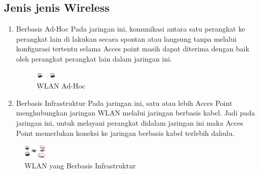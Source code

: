 \subsection{Jenis jenis Wireless}
\begin{enumerate}
\item Berbasis Ad-Hoc
Pada jaringan ini, komunikasi antara satu perangkat ke perangkat lain di lakukan secara
spontan atau langsung tanpa melalui konfigurasi tertentu selama Acces point masih dapat
diterima dengan baik oleh perangkat perangkat lain dalam jaringan ini.

\begin{figure}[ht]
\centerline{\includegraphics[width=0.1\textwidth]{figures/wlan1.jpg}}
\caption{WLAN Ad-Hoc}
\label{wlan}
\end {figure}

\item Berbasis Infrastruktur
Pada jaringan ini, satu atau lebih Acces Point menghubungkan jaringan WLAN melalui
jaringan berbasis kabel. Jadi pada jaringan ini, untuk melayani perangkat didalam
jaringan ini maka Acces Point memerlukan koneksi ke jaringan berbasis kabel terlebih
dahulu.
\end{enumerate}
\begin{figure}[ht]
\centerline{\includegraphics[width=0.1\textwidth]{figures/wlan-infrastruktur3.jpg}}
\caption{WLAN yang Berbasis Infrastruktur}
\label{wlan-infrastruktur}
\end {figure}

